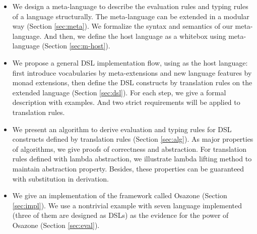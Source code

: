 \begin{itemize}
  \item We design a meta-language to describe the evaluation rules and typing rules of a language structurally.
    The meta-language can be extended in a modular way (Section \ref{sec:meta}).
    We formalize the syntax and semantics of our meta-language.
    And then, we define the host language \STLC{} as a whitebox using meta-language (Section \ref{sec:m-host}).
  \item We propose a general DSL implementation flow, using \STLC{} as the host language:
    first introduce vocabularies by meta-extensions and new language features by monad extensions,
    then define the DSL constructs by translation rules on the extended language (Section \ref{sec:dsl}). 
    For each step, we give a formal description with examples.
    And two strict requirements will be applied to translation rules.
  \item We present an algorithm to derive evaluation and typing rules for DSL constructs defined by translation rules (Section \ref{sec:alg}).
    As major properties of algorithms, we give proofs of correctness and abstraction. 
    For translation rules defined with lambda abstraction,
     we illustrate lambda lifting method to maintain abstraction property.
    Besides, these properties can be guaranteed with substitution in derivation.
  \item We give an implementation of the framework called Osazone (Section \ref{sec:impl}).
    We use a nontrivial example with seven language implemented (three of them are designed as DSLs) as the evidence for the power of Osazone (Section \ref{sec:eval}).
\end{itemize}

